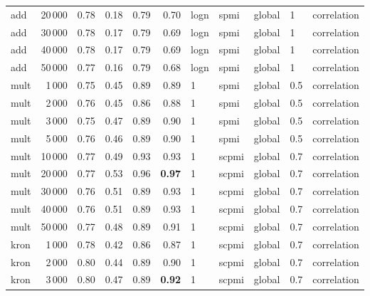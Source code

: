\begin{tabular}{lrrrrrlllll}
     add &           20\,000 &  0.78 &  0.18 &       0.79 &           0.70 &  logn &   spmi &  global &    1 &    correlation \\
     add &           30\,000 &  0.78 &  0.17 &       0.79 &           0.69 &  logn &   spmi &  global &    1 &    correlation \\
     add &           40\,000 &  0.78 &  0.17 &       0.79 &           0.69 &  logn &   spmi &  global &    1 &    correlation \\
     add &           50\,000 &  0.77 &  0.16 &       0.79 &           0.68 &  logn &   spmi &  global &    1 &    correlation \\ \addlinespace
    mult &            1\,000 &  0.75 &  0.45 &       0.89 &           0.89 &     1 &   spmi &  global &  0.5 &    correlation \\
    mult &            2\,000 &  0.76 &  0.45 &       0.86 &           0.88 &     1 &   spmi &  global &  0.5 &    correlation \\
    mult &            3\,000 &  0.75 &  0.47 &       0.89 &           0.90 &     1 &   spmi &  global &  0.5 &    correlation \\
    mult &            5\,000 &  0.76 &  0.46 &       0.89 &           0.90 &     1 &   spmi &  global &  0.5 &    correlation \\
    mult &           10\,000 &  0.77 &  0.49 &       0.93 &           0.93 &     1 &  scpmi &  global &  0.7 &    correlation \\
    mult &           20\,000 &  0.77 &  0.53 &       0.96 &           \textbf{0.97} &     1 &  scpmi &  global &  0.7 &    correlation \\
    mult &           30\,000 &  0.76 &  0.51 &       0.89 &           0.93 &     1 &  scpmi &  global &  0.7 &    correlation \\
    mult &           40\,000 &  0.76 &  0.51 &       0.89 &           0.93 &     1 &  scpmi &  global &  0.7 &    correlation \\
    mult &           50\,000 &  0.77 &  0.48 &       0.89 &           0.91 &     1 &  scpmi &  global &  0.7 &    correlation \\ \addlinespace
    kron &            1\,000 &  0.78 &  0.42 &       0.86 &           0.87 &     1 &  scpmi &  global &  0.7 &    correlation \\
    kron &            2\,000 &  0.80 &  0.44 &       0.89 &           0.90 &     1 &  scpmi &  global &  0.7 &    correlation \\
    kron &            3\,000 &  0.80 &  0.47 &       0.89 &           \textbf{0.92} &     1 &  scpmi &  global &  0.7 &    correlation \\

\end{tabular}

